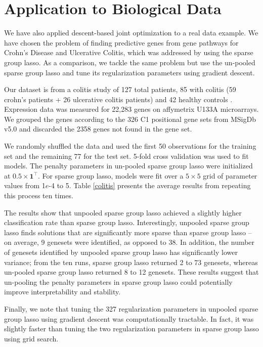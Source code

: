 \documentclass[10pt,letterpaper]{article}
\begin{document}
\section{Application to Biological Data}
We have also applied descent-based joint optimization to a real data example. We have chosen the problem of finding predictive genes from gene pathways for Crohn's Disease and Ulcerative Colitis, which was addressed by \citet{simon2013sparse} using the sparse group lasso. As a comparison, we tackle the same problem but use the un-pooled sparse group lasso and tune its regularization parameters using gradient descent.

Our dataset is from a colitis study of 127 total patients, 85 with colitis (59 crohn's patients + 26 ulcerative colitis patients) and 42 healthy controls \citep{burczynski2006molecular}. Expression data was measured for 22,283 genes on affymetrix U133A microarrays. We grouped the genes according to the 326 C1 positional gene sets from MSigDb v5.0 \citep{subramanian2005gene} and discarded the 2358 genes not found in the gene set.

We randomly shuffled the data and used the first 50 observations for the training set and the remaining 77 for the test set. 5-fold cross validation was used to fit models. The penalty parameters in un-pooled sparse group lasso were initialized at $0.5 \times \boldsymbol 1^\top$. For sparse group lasso, models were fit over a $5 \times 5$ grid of parameter values from 1$e$-4 to 5. Table \ref{colitis} presents the average results from repeating this process ten times.

The results show that unpooled sparse group lasso achieved a slightly higher classification rate than sparse group lasso. Interestingly, unpooled sparse group lasso finds solutions that are significantly more sparse than sparse group lasso -- on average, 9 genesets were identified, as opposed to 38. In addition, the number of genesets identified by unpooled sparse group lasso has significantly lower variance; from the ten runs, sparse group lasso returned 2 to 73 genesets, whereas un-pooled sparse group lasso returned 8 to 12 genesets. These results suggest that un-pooling the penalty parameters in sparse group lasso could potentially improve interpretability and stability.

Finally, we note that tuning the 327 regularization parameters in unpooled sparse group lasso using gradient descent was computationally tractable. In fact, it was slightly faster than tuning the two regularization parameters in sparse group lasso using grid search.
\end{document}
